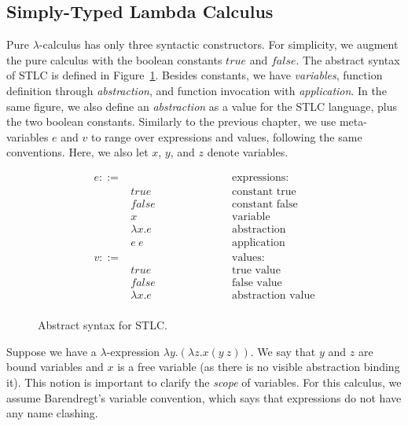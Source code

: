 \documentclass[tese,capa,english]{texufpel}
\begin{document}
\subsection{Simply-Typed Lambda Calculus}

Pure $\lambda$-calculus has only three syntactic constructors. For simplicity, we augment the pure calculus with the boolean constants $true$ and $false$. The abstract syntax of STLC is defined in Figure~\ref{fig:syntax-stlc}. Besides constants, we have \emph{variables}, function definition through \emph{abstraction}, and function invocation with \emph{application}. In the same figure, we also define an \emph{abstraction} as a value for the STLC language, plus the two boolean constants. Similarly to the previous chapter, we use meta-variables $e$ and $v$ to range over expressions and values, following the same conventions. Here, we also let $x$, $y$, and $z$ denote variables. 

\begin{figure}[!htb]
\[
\begin{array}{llr}
  e ::= & \ \ \ \ \ \ \ \ \ \ \ \ \ \ \ \ \ \ \ \ \ \ \ \ \ \ \ \ \ \ \ \ \ \ \ \ \ \  & \textrm{expressions: } \\
        & true & \textrm{constant true} \\
        & false & \textrm{constant false} \\
        & x & \textrm{variable} \\
        & \lambda x . e & \textrm{abstraction} \\
        & e ~ e & \textrm{application} \\
  v ::= & & \textrm{values:} \\
        & true & \textrm{true value} \\
        & false & \textrm{false value} \\
        & \lambda x . e & \textrm{abstraction value} \\
\end{array}
\]
\caption{Abstract syntax for STLC.}
\label{fig:syntax-stlc}
\end{figure}

\vspace{-1ex}

Suppose we have a $\lambda$-expression $\lambda y . (\lambda z . x (y ~ z))$. We say that $y$ and $z$ are bound variables and $x$ is a free variable (as there is no visible abstraction binding it). This notion is important to clarify the \emph{scope} of variables. For this calculus, we assume Barendregt's variable convention, which says that expressions do not have any name clashing. 
\end{document}
